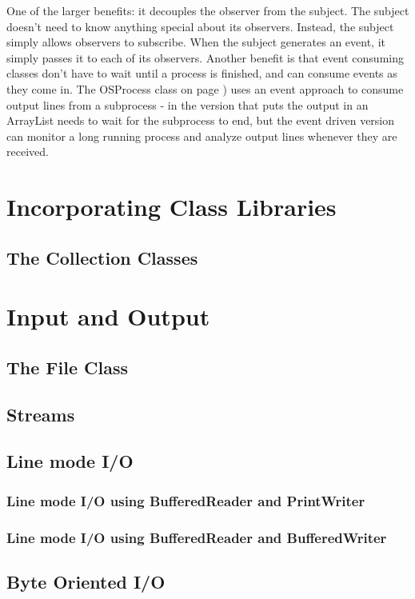 {{One of the larger benefits: it decouples the observer from the
subject. The subject doesn't need to know anything special about its
observers. Instead, the subject simply allows observers to
subscribe. When the subject generates an event, it simply passes it to
each of its observers. Another benefit is that event consuming classes
don't have to wait until a process is finished, and can consume events
as they come in. The OSProcess class on page
\pageref{outputeventlistener}) uses an event approach to consume
output lines from a subprocess - in the version that puts the output
in an ArrayList needs to wait for the subprocess to end, but the event
driven version can monitor a long running process and analyze output
lines whenever they are received.

\chapter{Incorporating Class Libraries}
\section{The Collection Classes}

\chapter{Input and Output}
\section{The File Class}
\section{Streams}
\section{Line mode I/O}
\subsection{Line mode I/O using BufferedReader and PrintWriter}
\subsection{Line mode I/O using BufferedReader and BufferedWriter}
\section{Byte Oriented I/O}
}}
